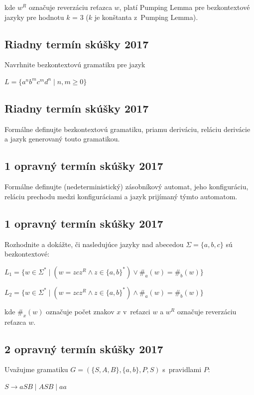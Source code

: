 \documentclass[11pt,a4paper]{article}
\begin{document}
		kde $w^R$ označuje reverzáciu reťazca $w$, platí Pumping Lemma pre bezkontextové jazyky pre hodnotu $k$ = 3 ($k$ je konštanta z~Pumping Lemma).

		\subsection{Riadny termín skúšky 2017}

		Navrhnite bezkontextovú gramatiku pre jazyk

		$L = \{a^nb^mc^md^n \mid n,m \geq 0\}$

		\subsection{Riadny termín skúšky 2017}

		Formálne definujte bezkontextovú gramatiku, priamu deriváciu, reláciu derivácie a jazyk generovaný touto gramatikou.

		\subsection{1 opravný termín skúšky 2017}

		Formálne definujte (nedeterministický) zásobníkový automat, jeho konfiguráciu, reláciu prechodu medzi konfiguráciami a jazyk prijímaný týmto automatom.

		\subsection{1 opravný termín skúšky 2017}

		Rozhodnite a dokážte, či nasledujúce jazyky nad abecedou $\Sigma = \{a,b,c\}$ sú bezkontextové:

		$L_1 = \{w \in \Sigma^* \mid (w = zcz^R \land z \in \{a,b\}^*) \lor \#_a(w) = \#_b(w)\}$

		$L_2 = \{w \in \Sigma^* \mid (w = zcz^R \land z \in \{a,b\}^*) \land \#_a(w) = \#_b(w)\}$

		kde $\#_x(w)$ označuje počet znakov $x$ v~reťazci $w$ a $w^R$ označuje reverzáciu reťazca $w$.

		\subsection{2 opravný termín skúšky 2017}

		Uvažujme gramatiku $G = (\{S,A,B\}, \{a,b\}, P, S)$ s~pravidlami $P$:

		$S \rightarrow aSB \mid ASB \mid aa$
\end{document}
